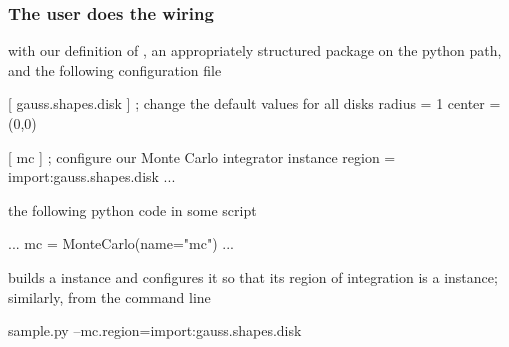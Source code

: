\begin{frame}[fragile]
%
  \frametitle{The user does the wiring}
%
  with our definition of , an appropriately structured package
   on the python path, and the following configuration file
%
  \begin{icfg}{}
 [ gauss.shapes.disk ] ; change the default values for all disks
 radius = 1
 center = (0,0)

 [ mc ] ; configure our Monte Carlo integrator instance
 region = import:gauss.shapes.disk
 ...
  \end{icfg}{}
%
 the following python code in some script 
%
 \begin{ipython}{}
   ...
   mc = MonteCarlo(name="mc")
   ...
 \end{ipython}
%
 builds a  instance and configures it so that its region of
 integration is a  instance; similarly, from the command line
%
 \begin{ish}{}
    sample.py --mc.region=import:gauss.shapes.disk
 \end{ish}
%
\end{frame}

